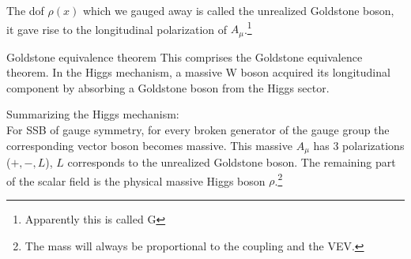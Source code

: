 The dof $\rho(x)$ which we gauged away is called the unrealized Goldstone boson, it gave rise to the longitudinal polarization of $A_\mu$.\footnote{Apparently this is called G}
\begin{mybox}{Goldstone equivalence theorem}
	This comprises the Goldstone equivalence theorem. In the Higgs mechanism, a massive W boson acquired its
	longitudinal component by absorbing a Goldstone boson from the Higgs sector. 
\end{mybox}
Summarizing the Higgs mechanism:\\
For SSB of gauge symmetry, for every broken generator of the gauge group the corresponding vector boson becomes massive. This massive $A_\mu$ has $3$ polarizations ($+,-,L$), $L$ corresponds to the unrealized Goldstone boson. The remaining part of the scalar field is the physical massive Higgs boson $\rho$.\footnote{The mass will always be proportional to the coupling and the VEV.}


